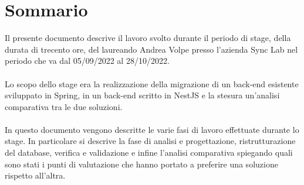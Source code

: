 
\cleardoublepage
{}
{}
\begingroup
\let\clearpage\relax
\let\cleardoublepage\relax
\let\cleardoublepage\relax

\chapter*{Sommario}

Il presente documento descrive il lavoro svolto durante il periodo di stage, della durata di trecento ore, del
laureando Andrea Volpe presso l'azienda Sync Lab nel periodo che va dal 05/09/2022 al 28/10/2022.
\\\\
Lo scopo dello stage era la realizzazione della migrazione di un back-end esistente sviluppato in Spring, in un back-end
scritto in NestJS e la stesura un'analisi comparativa tra le due soluzioni.
\\\\
In questo documento vengono descritte le varie fasi di lavoro effettuate durante lo stage. In particolare si descrive la fase
di analisi e progettazione, ristrutturazione del database, verifica e validazione e infine l'analisi comparativa spiegando
quali sono stati i punti di valutazione che hanno portato a preferire una soluzione rispetto all'altra.

%
%

\endgroup			

\vfill

